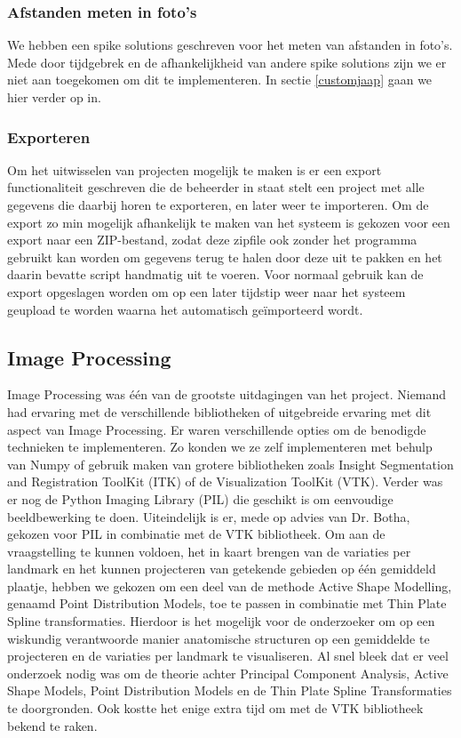 \subsubsection{Afstanden meten in foto's}
We hebben een spike solutions geschreven voor het meten van afstanden in foto's. 
Mede door tijdgebrek en de afhankelijkheid van andere spike solutions zijn we er niet aan toegekomen om dit te implementeren. 
In sectie \ref{customjaap} gaan we hier verder op in.

\subsubsection{Exporteren}
Om het uitwisselen van projecten mogelijk te maken is er een export functionaliteit geschreven die de beheerder in staat stelt een project met alle gegevens die daarbij horen te exporteren, en later weer te importeren.
Om de export zo min mogelijk afhankelijk te maken van het systeem is gekozen voor een export naar een ZIP-bestand, zodat deze zipfile ook zonder het programma gebruikt kan worden om gegevens terug te halen door deze uit te pakken en het daarin bevatte script handmatig uit te voeren.
Voor normaal gebruik kan de export opgeslagen worden om op een later tijdstip weer naar het systeem geupload te worden waarna het automatisch ge\"{i}mporteerd wordt.

\subsection{Image Processing}
\label{implementatie_image_processing}
Image Processing was \'{e}\'{e}n van de grootste uitdagingen van het project. 
Niemand had ervaring met de verschillende bibliotheken of uitgebreide ervaring met dit aspect van Image Processing. 
Er waren verschillende opties om de benodigde technieken te implementeren. 
Zo konden we ze zelf implementeren met behulp van Numpy\cite{numpy} of gebruik maken van grotere bibliotheken zoals Insight Segmentation and Registration ToolKit (ITK)\cite{ITK} of de Visualization ToolKit (VTK)\cite{vtk}. 
Verder was er nog de Python Imaging Library (PIL)\cite{pil} die geschikt is om eenvoudige beeldbewerking te doen. 
Uiteindelijk is er, mede op advies van Dr. Botha, gekozen voor PIL in combinatie met de VTK bibliotheek. 
Om aan de vraagstelling te kunnen voldoen, het in kaart brengen van de variaties per landmark en het kunnen projecteren van getekende gebieden op \'{e}\'{e}n gemiddeld plaatje, hebben we gekozen om een deel van de methode Active Shape Modelling, genaamd Point Distribution Models, toe te passen in combinatie met Thin Plate Spline transformaties. 
Hierdoor is het mogelijk voor de onderzoeker om op een wiskundig verantwoorde manier anatomische structuren op een gemiddelde te projecteren en de variaties per landmark te visualiseren.
Al snel bleek dat er veel onderzoek nodig was om de theorie achter Principal Component Analysis, Active Shape Models, Point Distribution Models en de Thin Plate Spline Transformaties te doorgronden. 
Ook kostte het enige extra tijd om met de VTK bibliotheek bekend te raken.

